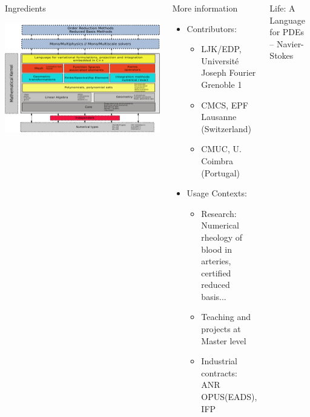 \documentclass[final,utf8,,hyperref={pdfpagelabels=false}]{beamer}
\begin{document}
\begin{frame}[containsverbatim]{}
\begin{columns}[t]
    \begin{block}{Ingredients}
      \centerline{\includegraphics[width=\linewidth]{arch2.pdf}}
    \end{block}
    \vfill
    \begin{block}{More information}
      \begin{itemize}
      \item Contributors:
        \begin{itemize}
        \item LJK/EDP, Université Joseph Fourier Grenoble 1
        \item CMCS, EPF Lausanne (Switzerland)
        \item CMUC, U. Coimbra (Portugal)
        \end{itemize}
      \item Usage Contexts:
        \begin{itemize}
        \item Research: Numerical rheology of blood in arteries, certified
          reduced basis...
        \item Teaching and projects at Master level
        \item Industrial contracts: ANR OPUS(EADS), IFP
        \end{itemize}
      \end{itemize}
    \end{block}
  
    \vfill
        \begin{block}{Life: A Language for PDEs -- Navier-Stokes}
      

\end{block}
\end{columns}
\end{frame}
\end{document}
